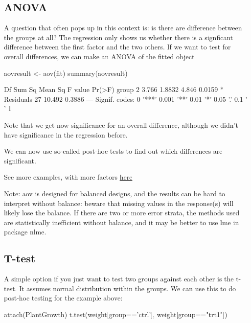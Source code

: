 \documentclass[a4paper,twoside]{tufte-book}\usepackage[]{graphicx}\usepackage[]{color}
\begin{document}
{\begin{appendices}
\subsection{ANOVA}

A question that often pops up in this context is: is there are difference between the groups at all? The regression only shows us whether there is a signficant difference between the first factor and the two others. If we want to test for overall differences, we can make an ANOVA of the fitted object

\begin{Schunk}
\begin{Sinput}
aovresult <- aov(fit)
summary(aovresult)
\end{Sinput}
\begin{Soutput}
            Df Sum Sq Mean Sq F value Pr(>F)  
group        2  3.766  1.8832   4.846 0.0159 *
Residuals   27 10.492  0.3886                 
---
Signif. codes:  0 '***' 0.001 '**' 0.01 '*' 0.05 '.' 0.1 ' ' 1
\end{Soutput}
\end{Schunk}

Note that we get now significance for an overall difference, although we didn't have significance in the regression before. 

We can now use so-called post-hoc tests to find out which differences are significant.

See more examples, with more factors \href{http://www.statmethods.net/stats/anova.html}{here} 

Note: aov is designed for balanced designs, and the results can be hard to interpret without balance: beware that missing values in the response(s) will likely lose the balance. If there are two or more error strata, the methods used are statistically inefficient without balance, and it may be better to use lme in package nlme.

\subsection{T-test}

A simple option if you just want to test two groups against each other is the t-test. It assumes normal distribution within the groups. We can use this to do post-hoc testing for the example above: 

\begin{Schunk}
\begin{Sinput}
attach(PlantGrowth)
t.test(weight[group=='ctrl'], weight[group=="trt1"])
\end{Sinput}
\begin{Soutput}


\end{Soutput}
\end{Schunk}
\end{appendices}}
\end{document}

